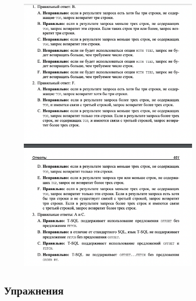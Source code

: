 \begin{figure}[h!]
	\begin{center}
		\includegraphics[width=0.8\textwidth]{img/ans7.png}
	\end{center}
	\captionsetup{justification=centering}
\end{figure}


\newpage
\subsection*{Упражнения}

